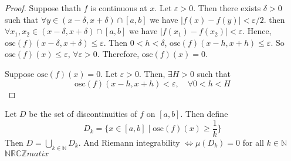 \documentclass[12pt]{article}
\theoremstyle{definition}
\theoremstyle{definition}
\newcommand{\abs}[1]{\lvert #1 \rvert}
\begin{document}
            \begin{proof}
                Suppose thath $f$ is continuous at $x$. Let $\varepsilon>0$.
                Then there exists $\delta>0$ such that $\forall y\in(x-\delta,
                x+\delta)\cap[a, b]$ we have $\abs{f(x)-f(y)}<\varepsilon/2$.
                then $\forall x_1, x_2\in (x-\delta, x+\delta)\cap[a, b]$ we
                have $\abs{f(x_1)-f(x_2)}<\varepsilon$. Hence,
                $\text{osc}(f)(x-\delta, x+\delta)\leq\varepsilon$. Then
                $0<h<\delta$, $\text{osc}(f)(x-h, x+h)\leq\varepsilon$. So
                $\text{osc}(f)(x)\leq\varepsilon$, $\forall \varepsilon>0$.
                Therefore, $\text{osc}(f)(x)=0$.\par Suppose
                $\text{osc}(f)(x)=0$. Let $\varepsilon>0$. Then, $\exists H>0$
                such that 
                    \begin{equation*}
                        \text{osc}(f)(x-h, x+h)<\varepsilon, \quad\forall 0<h<H 
                    \end{equation*}
            \end{proof}
            Let $D$ be the set of discontinuities of $f$ on $[a, b]$. Then
            define
                \begin{equation*}
                    D_k=\{x\in[a, b]\mid \text{osc}(f)(x)\geq\frac{1}{k}\} 
                \end{equation*}
            Then $D=\bigcup_{k\in\mathbb{N}}D_k$. And Riemann integrability
            $\iff\mu(D_k)=0$ for all $k\in\mathbb{N}$
            $\mathbb{N}\mathbb{R}\mathbb{C}\mathbb{Z}matix$ 
\end{document}
